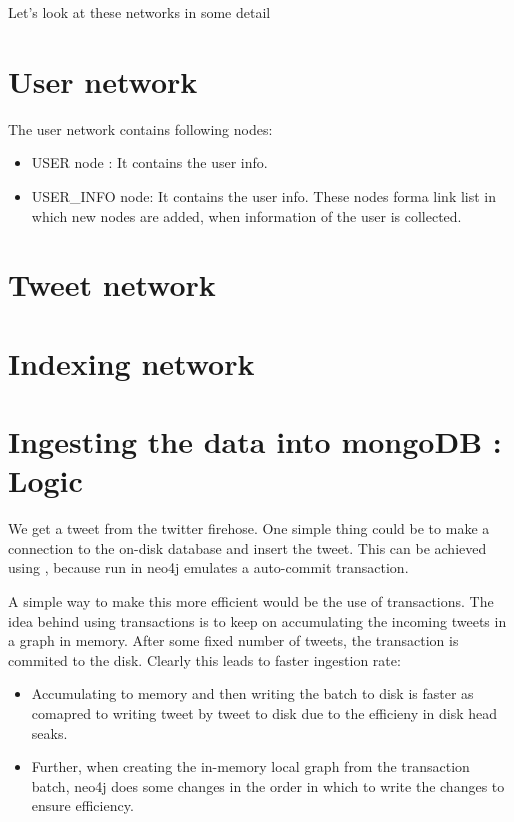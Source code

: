 \documentclass[letterpaper,10pt,english]{sphinxmanual}
\begin{document}
Let’s look at these networks in some detail


\section{User network}
\label{\detokenize{neo4j_data_ingestion:user-network}}
The user network contains following nodes:
\begin{itemize}
\item {} 
USER node : It contains the user info.

\item {} 
USER\_INFO node: It contains the user info. These nodes forma link list in which new nodes are added, when information of the user is collected.

\end{itemize}

\noindent{}

\noindent{}


\section{Tweet network}
\label{\detokenize{neo4j_data_ingestion:tweet-network}}
\noindent{}


\section{Indexing network}
\label{\detokenize{neo4j_data_ingestion:indexing-network}}
\noindent{}


\section{Ingesting the data into mongoDB : Logic}
\label{\detokenize{neo4j_data_ingestion:ingesting-the-data-into-mongodb-logic}}
We get a tweet from the twitter firehose. One simple thing could be to make a connection to the on-disk database and insert the tweet. This can be achieved using , because run in neo4j emulates a auto-commit transaction.

A simple way to make this more efficient would be the use of transactions. The idea behind using transactions is to keep on accumulating the incoming tweets in a graph in memory. After some fixed number of tweets, the transaction is commited to the disk. Clearly this leads to faster ingestion rate:
\begin{itemize}
\item {} 
Accumulating to memory and then writing the batch to disk is faster as comapred to writing tweet by tweet to disk due to the efficieny in disk head seaks.

\item {} 
Further, when creating the in-memory local graph from the transaction batch, neo4j does some changes in the order in which to write the changes to ensure efficiency.

\end{itemize}
\end{document}
